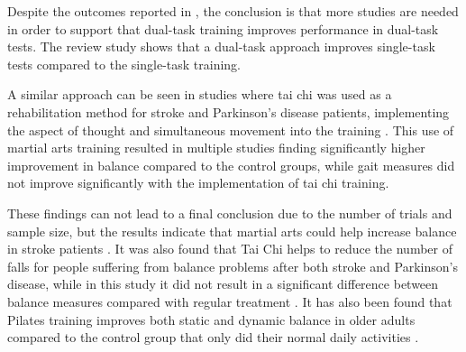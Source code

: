 Despite the outcomes reported in \cite{He2018}, the conclusion is that more studies are needed in order to support that dual-task training improves performance in dual-task tests. The review study shows that a dual-task approach improves single-task tests compared to the single-task training. \cite{He2018}

A similar approach can be seen in studies where tai chi was used as a rehabilitation method for stroke and Parkinson's disease patients, implementing the aspect of thought and simultaneous movement into the training \cite{Ding2012,Winser2018}. This use of martial arts training resulted in multiple studies finding significantly higher improvement in balance compared to the control groups, while gait measures did not improve significantly with the implementation of tai chi training. \cite{Deng2012}

These findings can not lead to a final conclusion due to the number of trials and sample size, but the results indicate that martial arts could help increase balance in stroke patients \cite{Deng2012}. It was also found that Tai Chi helps to reduce the number of falls for people suffering from balance problems after both stroke and Parkinson's disease, while in this study it did not result in a significant difference between balance measures compared with regular treatment \cite{Winser2018}. It has also been found that Pilates training improves both static and dynamic balance in older adults compared to the control group that only did their normal daily activities \cite{Moreno2017}.


